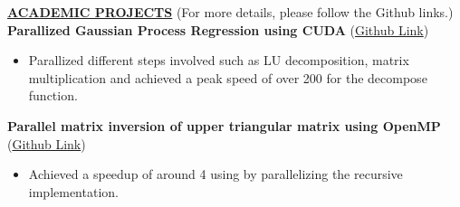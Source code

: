 \documentclass{article}
\begin{document}
\noindent \textbf{\underline{ACADEMIC PROJECTS}} (For more details, please follow the Github links.) \\
\noindent \textbf{Parallized Gaussian Process Regression using CUDA} (\href{https://github.com/biradarganesh25/Parallized-Gaussian-Process-Regression-using-CUDA}{Github Link})
\begin{itemize}[noitemsep,nolistsep,leftmargin=*]
	\item {Parallized different steps involved such as LU decomposition, matrix multiplication and achieved a peak speed of over 200 for the decompose function. \\}
\end{itemize}
\noindent \textbf{Parallel matrix inversion of upper triangular matrix using OpenMP} (\href{https://github.com/biradarganesh25/Parallel-matrix-inversion}{Github Link})
\begin{itemize}[noitemsep,nolistsep,leftmargin=*]
	\item {Achieved a speedup of around 4 using by parallelizing the recursive implementation. \\}
\end{itemize}


\end{document}
